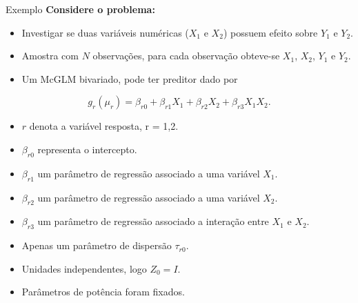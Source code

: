 \documentclass[
  ignorenonframetext,
  serif,
  professionalfont,
  usenames,
  dvipsnames,
  aspectratio = 169]{beamer}
\def\endColumns{\end{minipage}}%
\def\beginAHalfColumnT{\begin{minipage}[t]{0.49\textwidth}}%
\begin{document}
\begin{frame}{Exemplo}
\protect\hypertarget{exemplo-2}{}
\textbf{Considere o problema:}

\begin{itemize}
  
  \item Investigar se duas variáveis numéricas ($X_1$ e $X_2$) possuem efeito sobre $Y_1$ e $Y_2$.
  
  \item Amostra com $N$ observações, para cada observação obteve-se $X_1$, $X_2$, $Y_1$ e $Y_2$.

  \item Um McGLM bivariado, pode ter preditor dado por

\end{itemize}

\[
g_r(\mu_r) = \beta_{r0} + \beta_{r1} X_1 + \beta_{r2} X_2 + \beta_{r3} X_1X_2.
\] \beginAHalfColumnT

\begin{itemize}
  \itemsep 1ex
  \item $r$ denota a variável resposta, r = 1,2.
  \item $\beta_{r0}$ representa o intercepto.
  \item $\beta_{r1}$ um parâmetro de regressão associado a uma variável $X_1$. 
  \item $\beta_{r2}$ um parâmetro de regressão associado a uma variável $X_2$.
\end{itemize}  
\endColumns    
\beginAHalfColumnT

\begin{itemize}
  \itemsep 1ex
  \item $\beta_{r3}$ um parâmetro de regressão associado a interação entre $X_1$ e $X_2$. 
  \item Apenas um parâmetro de dispersão $\tau_{r0}$.
  \item Unidades independentes, logo $Z_0 = I$.
  \item Parâmetros de potência foram fixados.
\end{itemize}

\endColumns
\end{frame}
\end{document}
